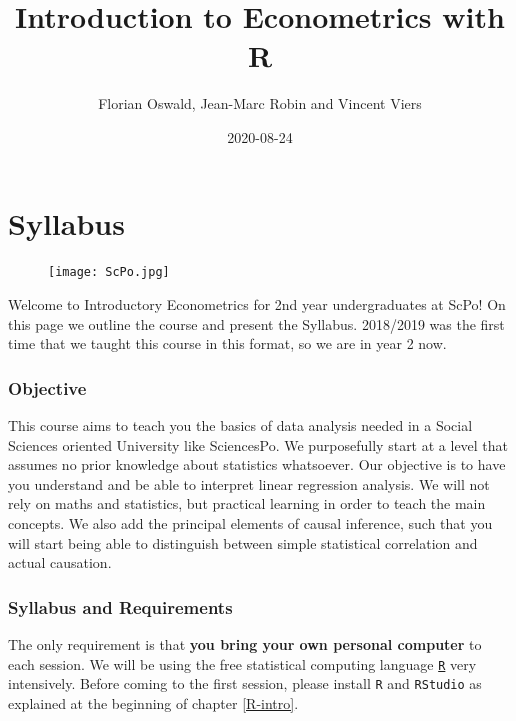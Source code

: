 \documentclass[]{book}
\title{Introduction to Econometrics with R}
\author{Florian Oswald, Jean-Marc Robin and Vincent Viers}
\date{2020-08-24}
\begin{document}
\maketitle

{
\setcounter{tocdepth}{1}
\tableofcontents
}
\chapter*{Syllabus}\label{syllabus}

\begin{figure}
\centering
\texttt{[image: ScPo.jpg]}
\caption{}
\end{figure}

Welcome to Introductory Econometrics for 2nd year undergraduates at
ScPo! On this page we outline the course and present the Syllabus.
2018/2019 was the first time that we taught this course in this format,
so we are in year 2 now.

\subsection*{Objective}\label{objective}

This course aims to teach you the basics of data analysis needed in a
Social Sciences oriented University like SciencesPo. We purposefully
start at a level that assumes no prior knowledge about statistics
whatsoever. Our objective is to have you understand and be able to
interpret linear regression analysis. We will not rely on maths and
statistics, but practical learning in order to teach the main concepts.
We also add the principal elements of causal inference, such that you
will start being able to distinguish between simple statistical
correlation and actual causation.

\subsection*{Syllabus and Requirements}\label{syllabus-and-requirements}

The only requirement is that \textbf{you bring your own personal
computer} to each session. We will be using the free statistical
computing language \href{https://www.r-project.org}{\texttt{R}} very
intensively. Before coming to the first session, please install
\texttt{R} and \texttt{RStudio} as explained at the beginning of chapter
\ref{R-intro}.
\end{document}
